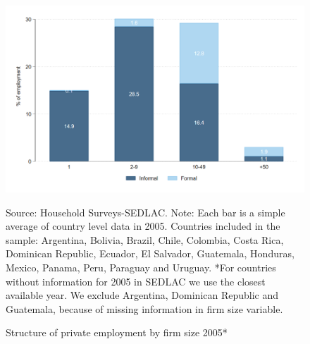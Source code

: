 \documentclass[english]{article}
\begin{document}
\begin{itemize}
            \begin{figure}[H]
                    \justifying
                    \caption{Structure of private employment by firm size 2005*}     \centerline{\includegraphics[scale=.3]{latex/figures/Snapshot/Employment and SS by firmsize_2005.png}
                    \label{fig:firmsize2005}}
                    \footnotesize{Source: Household Surveys-SEDLAC.}
                    \footnotesize{Note: Each bar is a simple average of country level data in 2005. Countries included in the sample: Argentina, Bolivia, Brazil, Chile, Colombia, Costa Rica, Dominican Republic, Ecuador, El Salvador, Guatemala, Honduras, Mexico, Panama, Peru, Paraguay and Uruguay. *For countries without information for 2005 in SEDLAC we use the closest available year. We exclude Argentina, Dominican Republic and Guatemala, because of missing information in firm size variable.}
            \end{figure}
    
    
            

\end{itemize}
\end{document}
